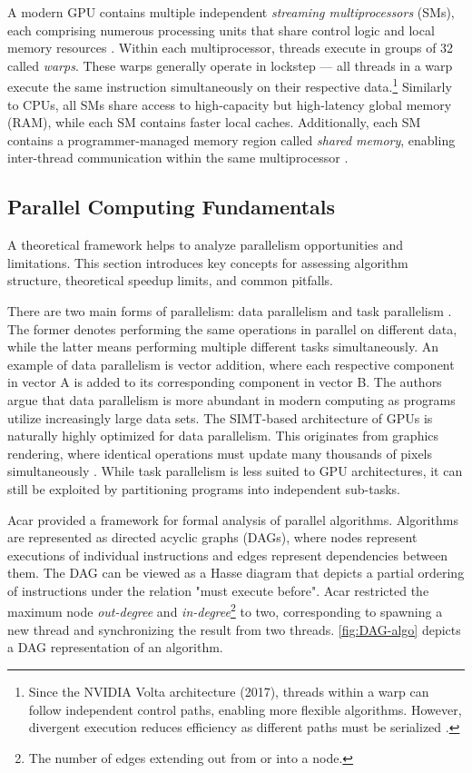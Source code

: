 \documentclass[english,12pt,a4paper,pdftex,sci,utf8]{aaltothesis}
\begin{document}
A modern GPU contains multiple independent \emph{streaming multiprocessors} (SMs), each comprising numerous processing units that share control logic and local memory resources \cite{kirk2016programming, cuda2025guide}. Within each multiprocessor, threads execute in groups of 32 called \emph{warps}. These warps generally operate in lockstep --- all threads in a warp execute the same instruction simultaneously on their respective data.\footnote{Since the NVIDIA Volta architecture (2017), threads within a warp can follow independent control paths, enabling more flexible algorithms. However, divergent execution reduces efficiency as different paths must be serialized \cite{cuda2025guide}.} Similarly to CPUs, all SMs share access to high-capacity but high-latency global memory (RAM), while each SM contains faster local caches. Additionally, each SM contains a programmer-managed memory region called \emph{shared memory}, enabling inter-thread communication within the same multiprocessor \cite{sanders2010cuda, cuda2025guide}.

\subsection{Parallel Computing Fundamentals}\label{subsec:parallell}

A theoretical framework helps to analyze parallelism opportunities and limitations. This section introduces key concepts for assessing algorithm structure, theoretical speedup limits, and common pitfalls.

There are two main forms of parallelism: data parallelism and task parallelism \cite{kirk2016programming}. The former denotes performing the same operations in parallel on different data, while the latter means performing multiple different tasks simultaneously. An example of data parallelism is vector addition, where each respective component in vector A is added to its corresponding component in vector B. The authors argue that data parallelism is more abundant in modern computing as programs utilize increasingly large data sets. The SIMT-based architecture of GPUs is naturally highly optimized for data parallelism. This originates from graphics rendering, where identical operations must update many thousands of pixels simultaneously \cite{sanders2010cuda}.  While task parallelism is less suited to GPU architectures, it can still be exploited by partitioning programs into independent sub-tasks.

Acar \cite{acar2016parallel} provided a framework for formal analysis of parallel algorithms. Algorithms are represented as directed acyclic graphs (DAGs), where nodes represent executions of individual instructions and edges represent dependencies between them. The DAG can be viewed as a Hasse diagram that depicts a partial ordering of instructions under the relation "must execute before". Acar restricted the maximum node \emph{out-degree} and \emph{in-degree}\footnote{The number of edges extending out from or into a node.} to two, corresponding to spawning a new thread and synchronizing the result from two threads. \cref{fig:DAG-algo} depicts a DAG representation of an algorithm.
\end{document}
